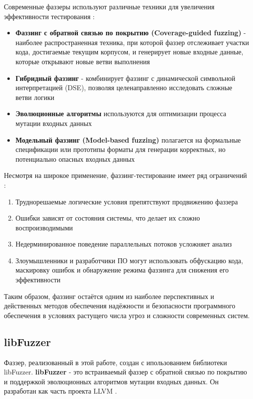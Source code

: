Современные фаззеры используют различные техники для увеличения эффективности тестирования \cite{Kuliamin}\cite{Boehme}:
\begin{itemize}
	\item \textbf{Фаззинг с обратной связью по покрытию (Coverage-guided fuzzing)} - наиболее распространенная техника, при которой фаззер отслеживает участки кода, достигаемые текущим корпусом, и генерирует новые входные данные, которые открывают новые ветви выполнения
	\item \textbf{Гибридный фаззинг} - комбинирует фаззинг с динамической символьной интерпретацией (DSE), позволяя целенаправленно исследовать сложные ветви логики
	\item \textbf{Эволюционные алгоритмы} используются для оптимизации процесса мутации входных данных
	\item \textbf{Модельный фаззинг (Model-based fuzzing)} полагается на формальные спецификации или прототипы форматы для генерации корректных, но потенциально опасных входных данных
\end{itemize}

Несмотря на широкое применение, фаззинг-тестирование имеет ряд ограничений \cite{Kuliamin}\cite{Boehme}:
\begin{enumerate}
	\item Труднорешаемые логические условия препятствуют продвижению фаззера
	\item Ошибки зависят от состояния системы, что делает их сложно воспроизводимыми
	\item Недерминированное поведение параллельных потоков усложняет анализ
	\item Злоумышленники и разработчики ПО могут использовать обфускацию кода, маскировку ошибок и обнаружение режима фаззинга для снижения его эффективности
\end{enumerate}

Таким образом, фаззинг остаётся одним из наиболее перспективных и действенных методов обеспечения надёжности и безопасности программного обеспечения в условиях растущего числа угроз и сложности современных систем.

\subsection{libFuzzer}
Фаззер, реализованный в этой работе, создан с ипользованием библиотеки libFuzzer. \textbf{libFuzzer} - это встраиваемый фаззер с обратной связью по покрытию и поддержкой эволюционных алгоритмов мутации входных данных. Он разработан как часть проекта LLVM \cite{Libfuzzer}.

